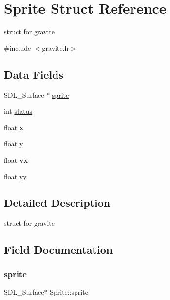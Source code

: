 \hypertarget{structSprite}{}\section{Sprite Struct Reference}
\label{structSprite}


struct for gravite  




{\ttfamily \#include $<$gravite.\+h$>$}

\subsection*{Data Fields}
\begin{DoxyCompactItemize}
\item 
S\+D\+L\+\_\+\+Surface $\ast$ \hyperlink{structSprite_a8f512dec05cec480280cb0a7751d7937}{sprite}
\item 
int \hyperlink{structSprite_a2500f95508a713c1ce20b2f09ec652da}{status}
\item 
\mbox{\label{structSprite_ad5222d1d6d41088ab80cf7e096461799}} 
float {\bfseries x}
\item 
float \hyperlink{structSprite_ad09503279ec7c1b96bf67566a917e183}{y}
\item 
\mbox{\label{structSprite_ae654b5c98a01bb8044609e792f8fab1b}} 
float {\bfseries vx}
\item 
float \hyperlink{structSprite_a37bb959256da6b84fed64a3787fc9840}{vy}
\end{DoxyCompactItemize}


\subsection{Detailed Description}
struct for gravite 

\subsection{Field Documentation}
\mbox{\label{structSprite_a8f512dec05cec480280cb0a7751d7937}} 
\subsubsection{\texorpdfstring{sprite}{sprite}}
{\footnotesize\ttfamily S\+D\+L\+\_\+\+Surface$\ast$ Sprite\+::sprite}

